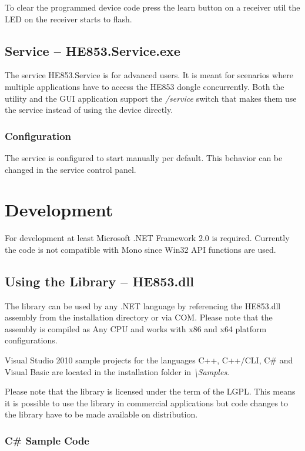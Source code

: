 \documentclass[
a4paper,
oneside,
halfparskip*,
normalheadings,
]
{scrbook}
\begin{document}
To clear the programmed device code press the learn button on a receiver util the LED
on the receiver starts to flash.

\section{Service -- HE853.Service.exe}

The service HE853.Service is for advanced users. It is meant for scenarios where multiple
applications have to access the HE853 dongle concurrently. Both the utility and the
GUI application support the \textit{/service} switch that makes them use the service
instead of using the device directly.

\subsection{Configuration}

The service is configured to start manually per default. This behavior can be changed
in the service control panel. 




\chapter{Development}

For development at least Microsoft .NET Framework 2.0 is required. Currently the code
is not compatible with Mono since Win32 API functions are used.

\section{Using the Library -- HE853.dll}

The library can be used by any .NET language by referencing the HE853.dll assembly from the
installation directory or via COM. Please note that the assembly is compiled as Any CPU
and works with x86 and x64 platform configurations.

Visual Studio 2010 sample projects for the languages C++, C++/CLI, C\# and Visual Basic
are located in the installation folder in \textit{\textbackslash Samples}.

Please note that the library is licensed under the term of the LGPL. This means it is
possible to use the library in commercial applications but code changes to the library
have to be made available on distribution.

\subsection{C\# Sample Code}
\end{document}

